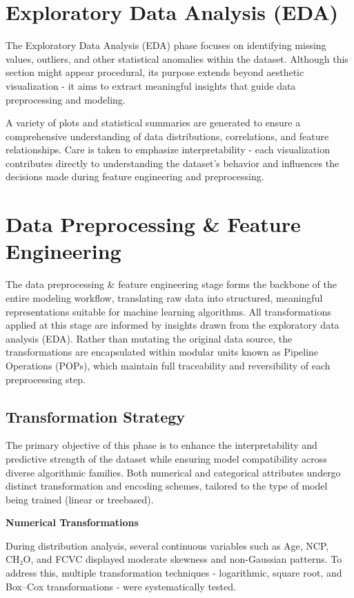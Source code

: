 \section{Exploratory Data Analysis (EDA)}\label{sec:exploratory-data-analysis}
The Exploratory Data Analysis (EDA) phase focuses on identifying missing values, outliers, and other statistical anomalies within the dataset.
Although this section might appear procedural, its purpose extends beyond aesthetic visualization - it aims to extract meaningful insights that guide data preprocessing and modeling.

A variety of plots and statistical summaries are generated to ensure a comprehensive understanding of data distributions, correlations, and feature relationships.
Care is taken to emphasize interpretability - each visualization contributes directly to understanding the dataset’s behavior and influences the decisions made during feature engineering and preprocessing.


\section{Data Preprocessing \& Feature Engineering}\label{sec:data-preprocessing}
The data preprocessing \& feature engineering stage forms the backbone of the entire modeling workflow, translating raw data into structured, meaningful representations suitable for machine learning algorithms.
All transformations applied at this stage are informed by insights drawn from the exploratory data analysis (EDA). Rather than mutating the original data source, the transformations are encapsulated within modular units known as Pipeline Operations (POPs), which maintain full traceability and reversibility of each preprocessing step.

\subsection{Transformation Strategy}\label{subsec:transformation-strategy}
The primary objective of this phase is to enhance the interpretability and predictive strength of the dataset while ensuring model compatibility across diverse algorithmic families.
Both numerical and categorical attributes undergo distinct transformation and encoding schemes, tailored to the type of model being trained (linear or treebased).

\textbf{Numerical Transformations}

During distribution analysis, several continuous variables such as Age, NCP, CH₂O, and FCVC displayed moderate skewness and non-Gaussian patterns.
To address this, multiple transformation techniques - logarithmic, square root, and Box–Cox transformations - were systematically tested.

